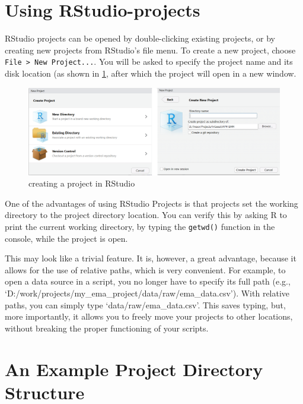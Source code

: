 \documentclass[]{book}
\begin{document}
\section{Using RStudio-projects}\label{using-rstudio-projects}


RStudio projects can be opened by double-clicking existing projects, or
by creating new projects from RStudio's file menu. To create a new
project, choose \texttt{File\ \textgreater{}\ New\ Project...}. You will
be asked to specify the project name and its disk location (as shown in
\ref{fig:fig5a}, after which the project will open in a new window.

\begin{figure}

{\centering \includegraphics[width=0.7\linewidth]{images/datamanagement/new_project} 

}

\caption{creating a project in RStudio}\label{fig:fig5a}
\end{figure}

One of the advantages of using RStudio Projects is that projects set the
working directory to the project directory location. You can verify this
by asking R to print the current working directory, by typing the
\texttt{getwd()} function in the console, while the project is open.

This may look like a trivial feature. It is, however, a great advantage,
because it allows for the use of relative paths, which is very
convenient. For example, to open a data source in a script, you no
longer have to specify its full path (e.g.,
`D:/work/projects/my\_ema\_project/data/raw/ema\_data.csv'). With
relative paths, you can simply type `data/raw/ema\_data.csv'. This saves
typing, but, more importantly, it allows you to freely move your
projects to other locations, without breaking the proper functioning of
your scripts.

\section{An Example Project Directory
Structure}\label{an-example-project-directory-structure}
\end{document}
